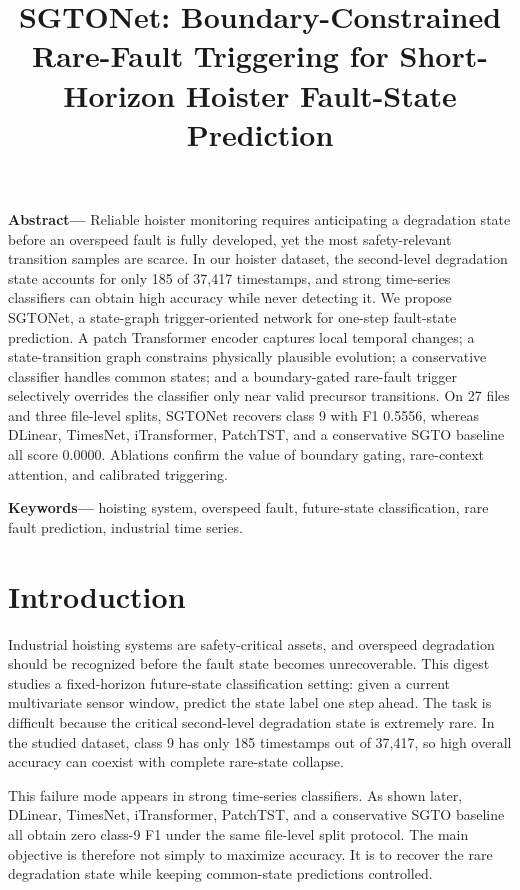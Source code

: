\documentclass[12pt,letterpaper]{article}
\title{\bfseries SGTONet: Boundary-Constrained Rare-Fault Triggering for Short-Horizon Hoister Fault-State Prediction}
\author{}
\date{}
\begin{document}
\maketitle
\vspace{-3em}

\noindent\textbf{Abstract---}
Reliable hoister monitoring requires anticipating a degradation state before an overspeed fault is fully developed, yet the most safety-relevant transition samples are scarce. In our hoister dataset, the second-level degradation state accounts for only 185 of 37,417 timestamps, and strong time-series classifiers can obtain high accuracy while never detecting it. We propose SGTONet, a state-graph trigger-oriented network for one-step fault-state prediction. A patch Transformer encoder captures local temporal changes; a state-transition graph constrains physically plausible evolution; a conservative classifier handles common states; and a boundary-gated rare-fault trigger selectively overrides the classifier only near valid precursor transitions. On 27 files and three file-level splits, SGTONet recovers class 9 with F1 0.5556, whereas DLinear, TimesNet, iTransformer, PatchTST, and a conservative SGTO baseline all score 0.0000. Ablations confirm the value of boundary gating, rare-context attention, and calibrated triggering.

\noindent\textbf{Keywords---} hoisting system, overspeed fault, future-state classification, rare fault prediction, industrial time series.

\section{Introduction}

Industrial hoisting systems are safety-critical assets, and overspeed degradation should be recognized before the fault state becomes unrecoverable. This digest studies a fixed-horizon future-state classification setting: given a current multivariate sensor window, predict the state label one step ahead. The task is difficult because the critical second-level degradation state is extremely rare. In the studied dataset, class 9 has only 185 timestamps out of 37,417, so high overall accuracy can coexist with complete rare-state collapse.

This failure mode appears in strong time-series classifiers. As shown later, DLinear, TimesNet, iTransformer, PatchTST, and a conservative SGTO baseline all obtain zero class-9 F1 under the same file-level split protocol. The main objective is therefore not simply to maximize accuracy. It is to recover the rare degradation state while keeping common-state predictions controlled.
\end{document}

